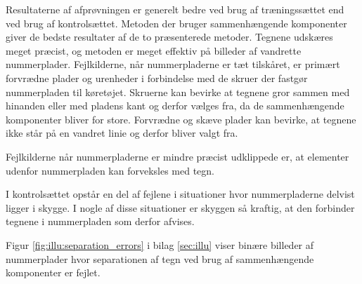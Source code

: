 
Resultaterne af afprøvningen er generelt bedre ved brug af træningssættet end ved brug af kontrolsættet. Metoden der bruger sammenhængende komponenter giver de bedste resultater af de to præsenterede metoder. Tegnene udskæres meget præcist, og metoden er meget effektiv på billeder af vandrette nummerplader. Fejlkilderne, når nummerpladerne er tæt tilskåret, er primært forvrædne plader og urenheder i forbindelse med de skruer der fastgør nummerpladen til køretøjet. Skruerne kan bevirke at tegnene gror sammen med hinanden eller med pladens kant og derfor vælges fra, da de sammenhængende komponenter bliver for store. Forvrædne og skæve plader kan bevirke, at tegnene ikke står på en vandret linie og derfor bliver valgt fra.


Fejlkilderne når nummerpladerne er mindre præcist udklippede er, at elementer udenfor nummerpladen kan forveksles med tegn.


I kontrolsættet opstår en del af fejlene i situationer hvor nummerpladerne delvist ligger i skygge. I nogle af disse situationer er skyggen så kraftig, at den forbinder tegnene i nummerpladen som derfor afvises.

Figur \vref{fig:illu:separation_errors} i bilag \ref{sec:illu} viser binære billeder af nummerplader hvor separationen af tegn ved brug af sammenhængende komponenter er fejlet.



